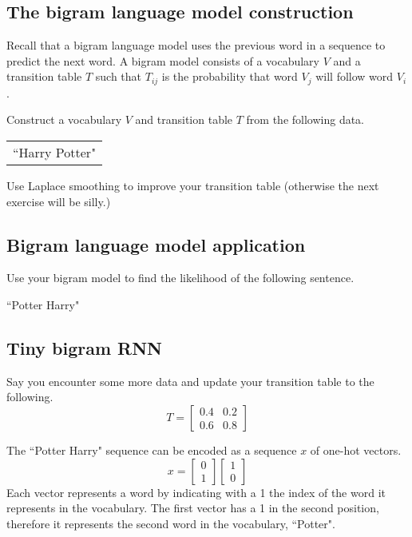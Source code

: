 \documentclass{article}
\begin{document}
\subsection{The bigram language model construction}
Recall that a bigram language model uses the previous word in a sequence to predict the next word. A bigram model consists of a vocabulary $V$ and a transition table $T$ such that $T_{ij}$ is the probability that word $V_j$ will follow word $V_i$.

Construct a vocabulary $V$ and transition table $T$ from the following data.

\begin{center}
\begin{tabular}{l}
``Harry Potter"
\end{tabular}
\end{center}

Use Laplace smoothing to improve your transition table (otherwise the next exercise will be silly.)

\subsection{Bigram language model application}
Use your bigram model to find the likelihood of the following sentence.
\begin{center}
    ``Potter Harry"
\end{center}

\subsection{Tiny bigram RNN}
Say you encounter some more data and update your transition table to the following.
$$ T = \begin{bmatrix} 0.4 & 0.2 \\ 0.6 & 0.8 \end{bmatrix} $$

The ``Potter Harry" sequence can be encoded as a sequence $x$ of one-hot vectors.
$$ x = \begin{bmatrix} 0 \\ 1 \end{bmatrix} \begin{bmatrix} 1 \\ 0 \end{bmatrix} $$
Each vector represents a word by indicating with a 1 the index of the word it represents in the vocabulary. The first vector has a 1 in the second position, therefore it represents the second word in the vocabulary, ``Potter".
\end{document}
